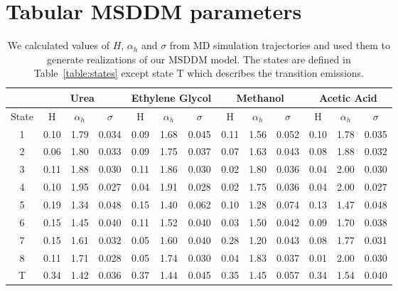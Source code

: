 \documentclass{article}
\begin{document}
  \section{Tabular MSDDM parameters}\label{section:msddm_params}
  
  \begin{table}[h]
  \centering
  \begin{tabular}{|c|c|c|c|c|c|c|c|c|c|c|c|c|}
  \hline
  & \multicolumn{3}{c|}{Urea} & \multicolumn{3}{c|}{Ethylene Glycol} & \multicolumn{3}{c|}{Methanol} & \multicolumn{3}{c|}{Acetic Acid} \\\hline
  State & H     &$\alpha_h$& $\sigma$ & H    &$\alpha_h$& $\sigma$   & H     &$\alpha_h$& $\sigma$ & H    &$\alpha_h$& $\sigma$ \\\hline
  1     & 0.10  & 1.79     & 0.034    & 0.09 & 1.68     & 0.045      & 0.11  & 1.56     & 0.052    & 0.10 & 1.78     & 0.035    \\
  2     & 0.06  & 1.80     & 0.033    & 0.09 & 1.75     & 0.037      & 0.07  & 1.63     & 0.043    & 0.08 & 1.88     & 0.032    \\
  3     & 0.11  & 1.88     & 0.030    & 0.11 & 1.86     & 0.030      & 0.02  & 1.80     & 0.036    & 0.04 & 2.00     & 0.030    \\
  4     & 0.10  & 1.95     & 0.027    & 0.04 & 1.91     & 0.028      & 0.02  & 1.75     & 0.036    & 0.04 & 2.00     & 0.027    \\
  5     & 0.19  & 1.34     & 0.048    & 0.15 & 1.40     & 0.062      & 0.10  & 1.28     & 0.074    & 0.13 & 1.47     & 0.048    \\
  6     & 0.15  & 1.45     & 0.040    & 0.11 & 1.52     & 0.040      & 0.03  & 1.50     & 0.042    & 0.09 & 1.70     & 0.038    \\
  7     & 0.15  & 1.61     & 0.032    & 0.05 & 1.60     & 0.040      & 0.28  & 1.20     & 0.043    & 0.08 & 1.77     & 0.031    \\
  8     & 0.11  & 1.71     & 0.028    & 0.05 & 1.74     & 0.030      & 0.04  & 1.83     & 0.037    & 0.01 & 2.00     & 0.030    \\
  T     & 0.34  & 1.42     & 0.036    & 0.37 & 1.44     & 0.045      & 0.35  & 1.45     & 0.057    & 0.34 & 1.54     & 0.040    \\\hline
  \end{tabular}
  \caption{We calculated values of $H$, $\alpha_h$ and $\sigma$ from MD simulation
  trajectories and used them to generate realizations of our MSDDM model. The states
  are defined in Table~\ref{table:states} except state T which describes the transition
  emissions.}\label{table:msddm_params}
  \end{table}  
  
\end{document}

